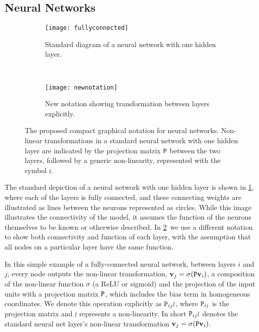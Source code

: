 \documentclass[thesis]{subfiles}
\begin{document}
	\subsection{Neural Networks}
	\begin{figure}[tbp] 
		\centering
		\begin{subfigure}[b]{0.45\textwidth}
			\centering
			\texttt{[image: fullyconnected]}
			\caption{Standard diagram of a neural network with one hidden layer.}
			\label{fig:oldnotation}
		\end{subfigure}
		~
		\begin{subfigure}[b]{0.45\textwidth}
			\centering
			\texttt{[image: newnotation]}
			\caption{New notation showing transformation between layers explicitly.}
			\label{fig:newnotation}
		\end{subfigure}
		\caption[New graphical notation for neural network.]{The proposed compact graphical notation for neural networks. Non-linear transformations in a standard neural network with one hidden layer are indicated by the projection matrix $\mat P$ between the two layers, followed by a generic non-linearity, represented with the symbol $\wr$.}
		\label{fig:newGraphLanguage}
	\end{figure}
	
	The standard depiction of a neural network with one hidden layer is shown in \cref{fig:oldnotation}, where each of the layers is fully connected, and these connecting weights are illustrated as lines between the neurons represented as circles. While this image illustrates the connectivity of the model, it assumes the function of the neurons themselves to be known or otherwise described. In \cref{fig:newnotation}\ we use a different notation to show both connectivity and function of each layer, with the assumption that all nodes on a particular layer have the same function.
	
	In this simple example of a fully-connected neural network, between layers $i$ and $j$, every node outputs the non-linear transformation, $\vec v_j = \sigma(\mat P \vec v_i)$, a composition of the non-linear function $\sigma$ (\eg a ReLU or sigmoid) and the projection of the input units with a projection matrix $\mat P$, which includes the bias term in homogeneous coordinates. We denote this operation explicitly as $\mat P_{ij} \wr$, where $\mat P_{ij}$ is the projection matrix and $\wr$ represents a non-linearity. In short $\mat P_{ij} \wr$ denotes the standard neural net layer's non-linear transformation $\vec v_j = \sigma(\mat P \vec v_i)$. 
	
\end{document}
